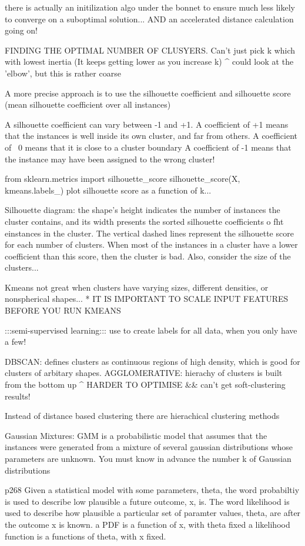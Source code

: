 there is actually an initilization algo under the bonnet
to ensure much less likely to converge on a suboptimal solution...
AND an accelerated distance calculation going on!

FINDING THE OPTIMAL NUMBER OF CLUSYERS.
Can't just pick k which with lowest inertia
(It keeps getting lower as you increase k)
^ could look at the 'elbow', but this is rather coarse

A more precise approach is to use the silhouette coefficient
and silhouette score (mean silhouette coefficient over all instances)

A silhouette coefficient can vary between -1 and +1.
A coefficient of +1 means that the instances is well inside its own cluster, and far from others.
A coefficient of ~0 means that it is close to a cluster boundary
A coefficient of -1 means that the instance may have been assigned to the wrong cluster!

from sklearn.metrics import silhouette_score
silhouette_score(X, kmeans.labels_)
plot silhouette score as a function of k...

Silhouette diagram:
the shape's height indicates the number of instances
the cluster contains, and its width presents the sorted silhouette coefficients o fht einstances in the cluster.
The vertical dashed lines represent the silhouette score for each number of clusters.
When most of the instances in a cluster have a lower coefficient than this score,
then the cluster is bad.
Also, consider the size of the clusters...

Kmeans not great when clusters have varying sizes,
different densities,
or nonspherical shapes...
* IT IS IMPORTANT TO SCALE INPUT FEATURES BEFORE YOU RUN KMEANS

:::semi-supervised learning:::
use to create labels for all data, when you only have a few!

DBSCAN: defines clusters as continuous regions of high density, which is good for clusters of arbitary shapes.
AGGLOMERATIVE: hierachy of clusters is built from the bottom up
^ HARDER TO OPTIMISE
&& can't get soft-clustering results!

Instead of distance based clustering
there are hierachical clustering methods


Gaussian Mixtures:
GMM is a probabilistic model that assumes that the instances were generated from a mixture of several gaussian distributions
whose parameters are unknown.
You must know in advance the number k of Gaussian distributions

p268
Given a statistical model with some parameters, theta, the word probabiltiy is used to describe low plausible a future outcome, x, is.
The word likelihood is used to describe how plausible a particular set of paramter values, theta, are after the outcome x is known.
a PDF is a function of x, with theta fixed
a likelihood function is a functions of theta, with x fixed.







